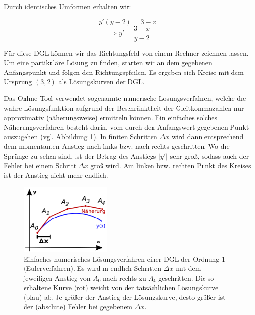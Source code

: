 \item

Durch identisches Umformen erhalten wir:

$$y'(y-2) = 3-x$$
$$\implies y' = \frac{3-x}{y-2}$$

Für diese DGL können wir das Richtungsfeld von einem Rechner zeichnen lassen. Um eine partikuläre Lösung zu finden, starten wir an dem gegebenen Anfangspunkt und folgen den Richtungspfeilen. Es ergeben sich Kreise mit dem Ursprung $(3, 2)$ als Lösungskurven der DGL.

Das Online-Tool verwendet sogenannte numerische Lösungsverfahren, welche die wahre Lösungsfunktion aufgrund der Beschränktheit der Gleitkommazahlen nur approximativ (näherungsweise) ermitteln können. Ein einfaches solches Näherungsverfahren besteht darin, vom durch den Anfangswert gegebenen Punkt auszugehen (vgl. Abbildung \ref{ex-ode-slope-field-1-img-b}). In finiten Schritten $\Delta x$ wird dann entsprechend dem momentanten Anstieg nach links bzw. nach rechts geschritten. Wo die Sprünge zu sehen sind, ist der Betrag des Anstiegs $|y'|$ sehr groß, sodass auch der Fehler bei einem Schritt $\Delta x$ groß wird. Am linken bzw. rechten Punkt des Kreises ist der Anstieg nicht mehr endlich.

\begin{figure}[ht]
	\centering
	\includegraphics[width=0.4\textwidth]{../tex-snippets/ex-ode-slope-field-1-img-b.png}
	\caption{Einfaches numerisches Lösungsverfahren einer DGL der Ordnung 1 (Eulerverfahren). Es wird in endlich Schritten $\Delta x$ mit dem jeweiligen Anstieg von $A_0$ nach rechts zu $A_4$ geschritten. Die so erhaltene Kurve (rot) weicht von der tatsächlichen Lösungskurve (blau) ab. Je größer der Anstieg der Lösungskurve, desto größer ist der (absolute) Fehler bei gegebenem $\Delta x$.}
	\label{ex-ode-slope-field-1-img-b}
\end{figure}


